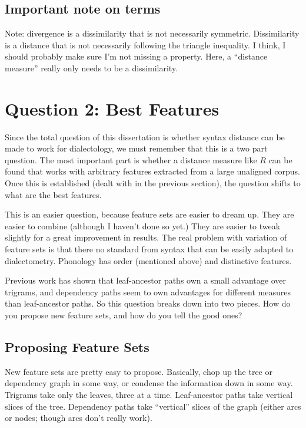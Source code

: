 \subsection{Important note on terms}

Note: divergence is a dissimilarity that is not necessarily
symmetric. Dissimilarity is a distance that is not necessarily
following the triangle inequality. I think, I should probably make
sure I'm not missing a property. Here, a ``distance measure'' really
only needs to be a dissimilarity.

\section{Question 2: Best Features}

Since the total question of this dissertation is whether syntax
distance can be made to work for dialectology, we must remember that
this is a two part question. The most important part is whether a
distance measure like $R$ can be found that works with arbitrary
features extracted from a large unaligned corpus. Once this is
established (dealt with in the previous section), the question shifts to what are
the best features.

This is an easier question, because feature sets are easier to dream
up. They are easier to combine (although I haven't done so yet.)
They are easier to tweak slightly for a great improvement in
results. The real problem with variation of feature sets is that there
no standard from syntax that can be easily adapted to
dialectometry. Phonology has order (mentioned above) and distinctive
features.

Previous work has shown that leaf-ancestor paths own a small advantage
over trigrams, and dependency paths seem to own advantages for
different measures than leaf-ancestor paths. So this question breaks
down into two pieces. How do you propose new feature sets, and how do
you tell the good ones?

\subsection{Proposing Feature Sets}

New feature sets are pretty easy to propose. Basically, chop up the
tree or dependency graph in some way, or condense the information down
in some way.  Trigrams take only the leaves, three at a
time. Leaf-ancestor paths take vertical slices of the tree. Dependency
paths take ``vertical'' slices of the graph (either arcs or nodes;
though arcs don't really work).

